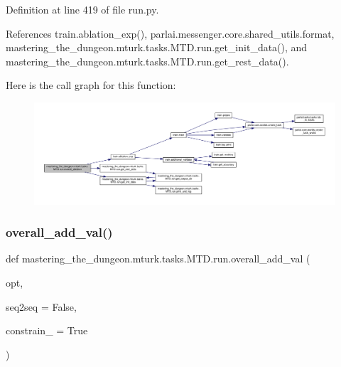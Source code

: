 Definition at line 419 of file run.\+py.



References train.\+ablation\+\_\+exp(), parlai.\+messenger.\+core.\+shared\+\_\+utils.\+format, mastering\+\_\+the\+\_\+dungeon.\+mturk.\+tasks.\+M\+T\+D.\+run.\+get\+\_\+init\+\_\+data(), and mastering\+\_\+the\+\_\+dungeon.\+mturk.\+tasks.\+M\+T\+D.\+run.\+get\+\_\+rest\+\_\+data().

Here is the call graph for this function\+:
\nopagebreak
\begin{figure}[H]
\begin{center}
\leavevmode
\includegraphics[width=350pt]{namespacemastering__the__dungeon_1_1mturk_1_1tasks_1_1MTD_1_1run_ae08c05229937617056b9054565a10840_cgraph}
\end{center}
\end{figure}
\mbox{\label{namespacemastering__the__dungeon_1_1mturk_1_1tasks_1_1MTD_1_1run_a56de28aa93db7fed38e30a16e85a1222}} 
\subsubsection{\texorpdfstring{overall\+\_\+add\+\_\+val()}{overall\_add\_val()}}
{\footnotesize\ttfamily def mastering\+\_\+the\+\_\+dungeon.\+mturk.\+tasks.\+M\+T\+D.\+run.\+overall\+\_\+add\+\_\+val (\begin{DoxyParamCaption}\item[{}]{opt,  }\item[{}]{seq2seq = {\ttfamily False},  }\item[{}]{constrain\+\_\+ = {\ttfamily True} }\end{DoxyParamCaption})}



